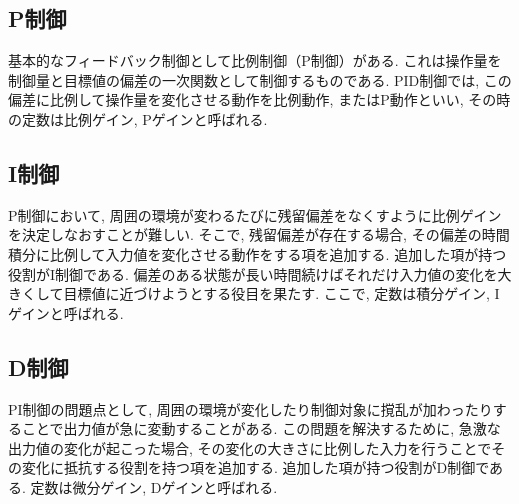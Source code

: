 \subsection{P制御}
基本的なフィードバック制御として比例制御（P制御）がある.
これは操作量を制御量と目標値の偏差の一次関数として制御するものである.
PID制御では, この偏差に比例して操作量を変化させる動作を比例動作, またはP動作といい, その時の定数は比例ゲイン, Pゲインと呼ばれる.

\subsection{I制御}
P制御において, 周囲の環境が変わるたびに残留偏差をなくすように比例ゲインを決定しなおすことが難しい.
そこで, 残留偏差が存在する場合, その偏差の時間積分に比例して入力値を変化させる動作をする項を追加する.
追加した項が持つ役割がI制御である.
偏差のある状態が長い時間続けばそれだけ入力値の変化を大きくして目標値に近づけようとする役目を果たす.
ここで, 定数は積分ゲイン, Iゲインと呼ばれる.

\subsection{D制御}
PI制御の問題点として, 周囲の環境が変化したり制御対象に撹乱が加わったりすることで出力値が急に変動することがある.
この問題を解決するために, 急激な出力値の変化が起こった場合, その変化の大きさに比例した入力を行うことでその変化に抵抗する役割を持つ項を追加する.
追加した項が持つ役割がD制御である.
定数は微分ゲイン, Dゲインと呼ばれる.

\newpage